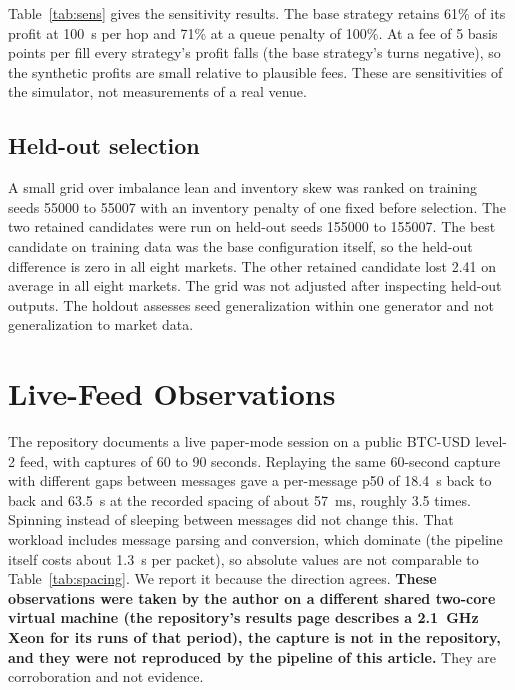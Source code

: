 \documentclass{ieeeaccess}
\begin{document}
\begin{table}[t]
\caption{Mean synthetic profit and loss by variant under delay, queue-penalty and fee scenarios (eight markets of 40{,}000 requests). Delay applies to each of three hops, so 100~\textmu s adds 300~\textmu s across them before jitter. Source: \texttt{sensitivity\_statistics.csv}.}
\label{tab:sens}
\centering\footnotesize
\resizebox{\columnwidth}{!}{}
\end{table}
Table~\ref{tab:sens} gives the sensitivity results. The base strategy retains 61\% of its profit at 100~\textmu s per hop and 71\% at a queue penalty of 100\%. At a fee of 5 basis points per fill every strategy's profit falls (the base strategy's turns negative), so the synthetic profits are small relative to plausible fees. These are sensitivities of the simulator, not measurements of a real venue.

\subsection{Held-out selection}
A small grid over imbalance lean and inventory skew was ranked on training seeds 55000 to 55007 with an inventory penalty of one fixed before selection. The two retained candidates were run on held-out seeds 155000 to 155007. The best candidate on training data was the base configuration itself, so the held-out difference is zero in all eight markets. The other retained candidate lost 2.41 on average in all eight markets. The grid was not adjusted after inspecting held-out outputs. The holdout assesses seed generalization within one generator and not generalization to market data.

\section{Live-Feed Observations}
\label{sec:live}
The repository documents a live paper-mode session on a public BTC-USD level-2 feed, with captures of 60 to 90 seconds. Replaying the same 60-second capture with different gaps between messages gave a per-message p50 of 18.4~\textmu s back to back and 63.5~\textmu s at the recorded spacing of about 57~ms, roughly 3.5 times. Spinning instead of sleeping between messages did not change this. That workload includes message parsing and conversion, which dominate (the pipeline itself costs about 1.3~\textmu s per packet), so absolute values are not comparable to Table~\ref{tab:spacing}. We report it because the direction agrees. \textbf{These observations were taken by the author on a different shared two-core virtual machine (the repository's results page describes a 2.1~GHz Xeon for its runs of that period), the capture is not in the repository, and they were not reproduced by the pipeline of this article.} They are corroboration and not evidence.
\end{document}
